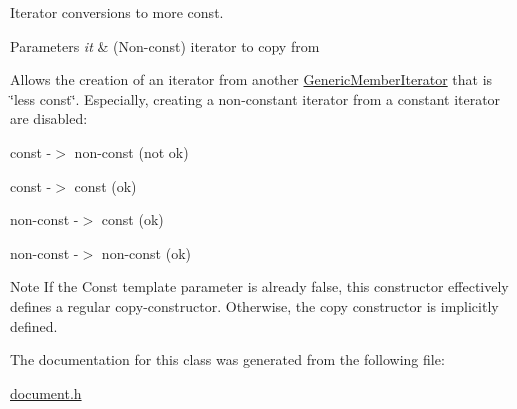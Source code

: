 Iterator conversions to more const. 


\begin{DoxyParams}{Parameters}
{\em it} & (Non-\/const) iterator to copy from\\
\hline
\end{DoxyParams}
Allows the creation of an iterator from another \hyperlink{a02004}{Generic\+Member\+Iterator} that is \char`\"{}less const\char`\"{}. Especially, creating a non-\/constant iterator from a constant iterator are disabled\+: \begin{DoxyItemize}
\item const -\/$>$ non-\/const (not ok) \item const -\/$>$ const (ok) \item non-\/const -\/$>$ const (ok) \item non-\/const -\/$>$ non-\/const (ok)\end{DoxyItemize}
\begin{DoxyNote}{Note}
If the {\ttfamily Const} template parameter is already {\ttfamily false}, this constructor effectively defines a regular copy-\/constructor. Otherwise, the copy constructor is implicitly defined. 
\end{DoxyNote}


The documentation for this class was generated from the following file\+:\begin{DoxyCompactItemize}
\item 
\hyperlink{a00476}{document.\+h}\end{DoxyCompactItemize}

